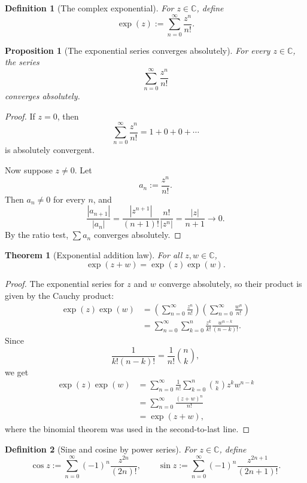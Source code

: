 \documentclass[11pt]{article}
\newtheorem{definition}{Definition}[section]
\newtheorem{proposition}{Proposition}[section]
\newtheorem{theorem}{Theorem}[section]
\newcommand{\C}{\mathbb{C}}
\newcommand{\abs}[1]{\left|#1\right|}
\begin{document}
\begin{definition}[The complex exponential]
For $z\in\C$, define
\[
  \exp(z):=\sum_{n=0}^{\infty}\frac{z^{n}}{n!}.
\]
\end{definition}

\begin{proposition}[The exponential series converges absolutely]
For every $z\in\C$, the series
\[
  \sum_{n=0}^{\infty}\frac{z^{n}}{n!}
\]
converges absolutely.
\end{proposition}

\begin{proof}
If $z=0$, then
\[
  \sum_{n=0}^{\infty}\frac{z^{n}}{n!}=1+0+0+\cdots
\]
is absolutely convergent.

Now suppose $z\ne0$.
Let
\[
  a_{n}:=\frac{z^{n}}{n!}.
\]
Then $a_{n}\ne0$ for every $n$, and
\[
  \frac{\abs{a_{n+1}}}{\abs{a_{n}}}
  =
  \frac{\abs{z^{n+1}}}{(n+1)!}\frac{n!}{\abs{z^{n}}}
  =
  \frac{\abs{z}}{n+1}
  \to0.
\]
By the ratio test, $\sum a_{n}$ converges absolutely.
\end{proof}

\begin{theorem}[Exponential addition law]
For all $z,w\in\C$,
\[
  \exp(z+w)=\exp(z)\exp(w).
\]
\end{theorem}

\begin{proof}
The exponential series for $z$ and $w$ converge absolutely, so their product is given by the Cauchy product:
\[
\begin{aligned}
  \exp(z)\exp(w)
    &=
    \left(\sum_{n=0}^{\infty}\frac{z^{n}}{n!}\right)
    \left(\sum_{n=0}^{\infty}\frac{w^{n}}{n!}\right) \\
    &=
    \sum_{n=0}^{\infty}
    \sum_{k=0}^{n}
    \frac{z^{k}}{k!}\frac{w^{n-k}}{(n-k)!}.
\end{aligned}
\]
Since
\[
  \frac{1}{k!(n-k)!}
  =
  \frac{1}{n!}\binom{n}{k},
\]
we get
\[
\begin{aligned}
  \exp(z)\exp(w)
    &=
    \sum_{n=0}^{\infty}\frac{1}{n!}
    \sum_{k=0}^{n}\binom{n}{k}z^{k}w^{n-k} \\
    &=
    \sum_{n=0}^{\infty}\frac{(z+w)^{n}}{n!} \\
    &= \exp(z+w),
\end{aligned}
\]
where the binomial theorem was used in the second-to-last line.
\end{proof}

\begin{definition}[Sine and cosine by power series]
For $z\in\C$, define
\[
  \cos z
  :=\sum_{n=0}^{\infty}(-1)^{n}\frac{z^{2n}}{(2n)!},
  \qquad
  \sin z
  :=\sum_{n=0}^{\infty}(-1)^{n}\frac{z^{2n+1}}{(2n+1)!}.
\]
\end{definition}
\end{document}
